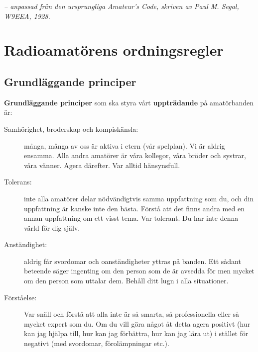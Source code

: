   
  

\emph{-- anpassad från den ursprungliga Amateur's Code, skriven av Paul M. Segal, W9EEA, 1928.}

\section[Ordningsregler]{Radioamatörens ordnings\-regler}

\subsection{Grundläggande principer}
\textbf{Grundläggande principer} som ska styra vårt \textbf{uppträdande} på
amatörbanden är:

\begin{description}
\item[Samhörighet, broderskap och kompiskänsla:] många, många av oss
  är aktiva i etern (vår spelplan).
  Vi är aldrig ensamma.
  Alla andra amatörer är våra kollegor, våra bröder och systrar, våra vänner.
  Agera därefter.
  Var alltid hänsynsfull.

\item[Tolerans:] inte alla amatörer delar nödvändigtvis samma
  uppfattning som du, och din uppfattning är kanske inte den bästa.
  Förstå att det finns andra med en annan uppfattning om ett visst tema.
  Var tolerant.
  Du har inte denna värld för dig själv.

\item[Anständighet:] aldrig får svordomar och oanständigheter yttras
  på banden.
  Ett sådant beteende säger ingenting om den person som de är avsedda för men
  mycket om den person som uttalar dem.
  Behåll ditt lugn i alla situationer.

\item[Förståelse:] Var snäll och förstå att alla inte är så smarta,
  så professionella eller så mycket expert som du.
  Om du vill göra något åt detta agera positivt (hur kan jag hjälpa till,
  hur kan jag förbättra, hur kan jag lära ut) i stället för negativt
  (med svordomar, förolämpningar etc.).
\end{description}

